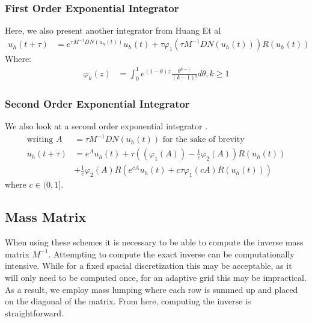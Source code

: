 \subsubsection{First Order Exponential Integrator}
Here, we also present another integrator from Huang Et al \cite{Huang2022}
\begin{align*}
u_h(t+\tau) &= e^{\tau M^{-1} DN(u_h(t))}u_h(t) + \tau \varphi_1(\tau M^{-1} DN(u_h(t)))R(u_h(t))
\end{align*}
Where:
\begin{align*}
    \varphi_k(z) &= \int^1_0e^{(1-\theta)z}\frac{\theta^{k-1}}{(k-1)!}d\theta, k \geq 1
\end{align*}

\subsubsection{Second Order Exponential Integrator}
We also look at a second order exponential integrator \cite{Huang2022}.
\begin{align*}
    \text{writing } A &= \tau M^{-1} DN(u_h(t)) \text{ for the sake of brevity}\\
    u_h(t+\tau) &= e^{A}u_h(t) + \tau((\varphi_1(A)) - \frac 1{c}\varphi_2(A))R(u_h(t))\\
    & + \frac1{c}\varphi_2(A)R(e^{cA}u_h(t) + c\tau\varphi_1(c A)R(u_h(t)))
\end{align*}
where $c \in (0,1]$.

\subsection{Mass Matrix}
When using these schemes it is necessary to be able to compute the inverse mass matrix $M^{-1}$.
Attempting to compute the exact inverse can be computationally intensive. While for a fixed spacial discretization this may be acceptable, as it will only need to be computed once, for an adaptive grid this may be impractical.
As a result, we employ mass lumping where each row is summed up and placed on the diagonal of the matrix.
From here, computing the inverse is straightforward.

